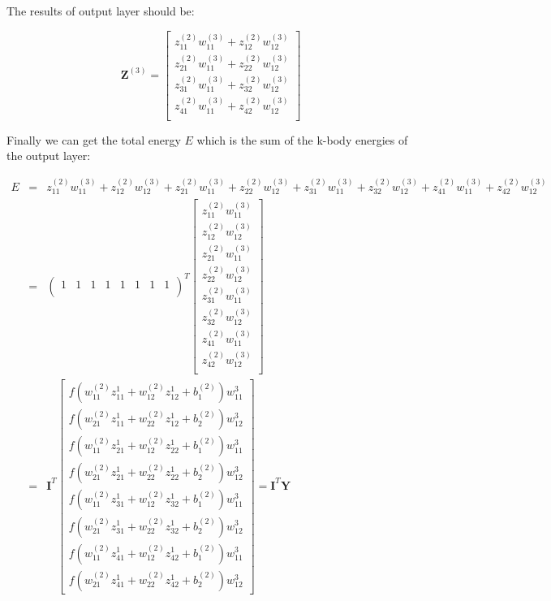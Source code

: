 \documentclass{article}
\begin{document}
\noindent The results of output layer should be:

\begin{equation}
\mathbf{Z}^{(3)} = \left[\begin{array}{c}
	z^{(2)}_{11}w^{(3)}_{11} + z^{(2)}_{12}w^{(3)}_{12} \\
	z^{(2)}_{21}w^{(3)}_{11} + z^{(2)}_{22}w^{(3)}_{12} \\
	z^{(2)}_{31}w^{(3)}_{11} + z^{(2)}_{32}w^{(3)}_{12} \\
	z^{(2)}_{41}w^{(3)}_{11} + z^{(2)}_{42}w^{(3)}_{12} \\
\end{array}
\right]
\end{equation}

\noindent Finally we can get the total energy $E$ which is the sum of the k-body energies of 
the output layer:

\begin{eqnarray}
E 
& = & 
z^{(2)}_{11}w^{(3)}_{11} + z^{(2)}_{12}w^{(3)}_{12} + 
z^{(2)}_{21}w^{(3)}_{11} + z^{(2)}_{22}w^{(3)}_{12} + 
z^{(2)}_{31}w^{(3)}_{11} + z^{(2)}_{32}w^{(3)}_{12} + 
z^{(2)}_{41}w^{(3)}_{11} + z^{(2)}_{42}w^{(3)}_{12} \nonumber \\
& = &
\left(\begin{array}{cccccccc}
	1 & 1 & 1 & 1 & 1 & 1 & 1 & 1 \\
\end{array}
\right)^T
\left[\begin{array}{c}
	z^{(2)}_{11}w^{(3)}_{11} \\
	z^{(2)}_{12}w^{(3)}_{12} \\
	z^{(2)}_{21}w^{(3)}_{11} \\
	z^{(2)}_{22}w^{(3)}_{12} \\
	z^{(2)}_{31}w^{(3)}_{11} \\
	z^{(2)}_{32}w^{(3)}_{12} \\
	z^{(2)}_{41}w^{(3)}_{11} \\
	z^{(2)}_{42}w^{(3)}_{12} \\
\end{array}
\right] \nonumber \\
& = &
\mathbf{I}^T
\left[\begin{array}{c}
	f(w^{(2)}_{11}z^1_{11} + w^{(2)}_{12}z^1_{12} + b^{(2)}_1)w^3_{11} \\
	f(w^{(2)}_{21}z^1_{11} + w^{(2)}_{22}z^1_{12} + b^{(2)}_2)w^3_{12} \\
	f(w^{(2)}_{11}z^1_{21} + w^{(2)}_{12}z^1_{22} + b^{(2)}_1)w^3_{11} \\ 
	f(w^{(2)}_{21}z^1_{21} + w^{(2)}_{22}z^1_{22} + b^{(2)}_2)w^3_{12} \\
	f(w^{(2)}_{11}z^1_{31} + w^{(2)}_{12}z^1_{32} + b^{(2)}_1)w^3_{11} \\
	f(w^{(2)}_{21}z^1_{31} + w^{(2)}_{22}z^1_{32} + b^{(2)}_2)w^3_{12} \\
	f(w^{(2)}_{11}z^1_{41} + w^{(2)}_{12}z^1_{42} + b^{(2)}_1)w^3_{11} \\
	f(w^{(2)}_{21}z^1_{41} + w^{(2)}_{22}z^1_{42} + b^{(2)}_2)w^3_{12}
\end{array}
\right] = \mathbf{I}^T \mathbf{Y}
\end{eqnarray}
\end{document}
